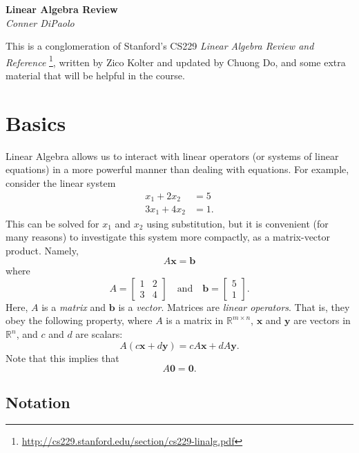 \documentclass{article}
\newcommand{\1}{\mathbf{1}}
\newcommand{\0}{\mathbf{0}}
\newcommand{\xx}{\mathbf{x}}
\newcommand{\yy}{\mathbf{y}}
\newcommand{\bb}{\mathbf{b}}
\newcommand{\RR}{\mathbb{R}}
\newcommand{\m}[1]{\begin{bmatrix} #1 \end{bmatrix}}
\begin{document}
\begin{center}
  \Large\textbf{Linear Algebra Review}\\
  \large\textit{Conner DiPaolo}
\end{center}
\vspace*{1em}

\tableofcontents
\vspace{1em}

This is a conglomeration of Stanford's CS229 \textit{Linear Algebra Review and Reference}
\footnote{\url{http://cs229.stanford.edu/section/cs229-linalg.pdf}}, written by Zico Kolter
and updated by Chuong Do, and some extra material that will be helpful in the
course.

\section{Basics}

Linear Algebra allows us to interact with linear operators (or systems
of linear equations) in a more powerful manner than dealing with equations.
For example, consider the linear system
\begin{align*}
    x_1 + 2x_2 &= 5\\
    3x_1 + 4x_2 &= 1.
\end{align*}
This can be solved for $x_1$ and $x_2$ using substitution, but it is
convenient (for many reasons) to investigate this system more compactly,
as a matrix-vector product. Namely,
\[
    A\xx = \bb
\]
where
\[
    A = \m{1&2\\3&4} \quad\text{and}\quad \bb = \m{5\\1}.
\]
Here, $A$ is a \textit{matrix} and $\bb$ is a \textit{vector}. Matrices are
\textit{linear operators}. That is, they obey the following property, where
$A$ is a matrix in $\RR^{m\times n}$, $\xx$ and $\yy$ are vectors in $\RR^n$,
and $c$ and $d$ are scalars:
\[
    A(c\xx+d\yy) = cA\xx + dA\yy.
\]
Note that this implies that
\[
    A\0 = \0.
\]

\subsection{Notation}
\end{document}

